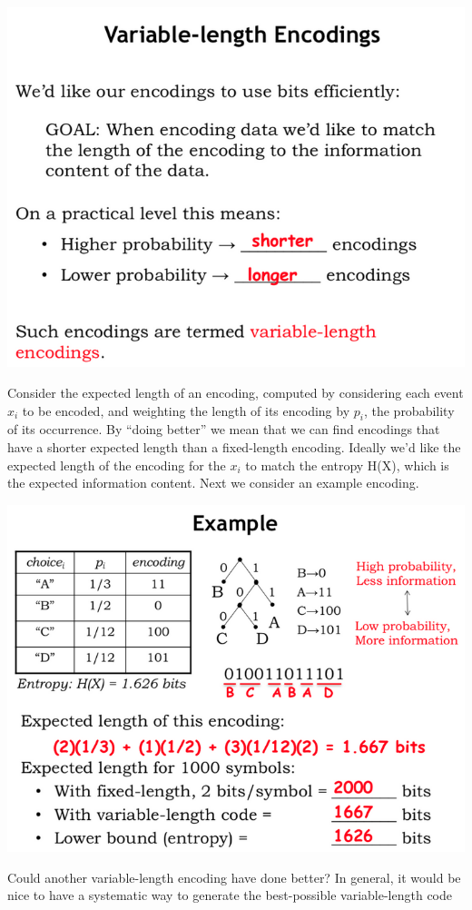 \documentclass[a4paper,twoside]{article}
\numberwithin{equation}{section}
\begin{document}
\begin{center}
    \includegraphics[scale=0.3]{assets/variable_length_encoding.png}
\end{center}
Consider the expected length of an encoding, computed by considering each event $x_i$  to be encoded,
 and weighting the length of its encoding by $p_i$, the probability of its occurrence. By “doing better”
  we mean that we can find encodings that have a shorter expected length than a fixed-length encoding.
  Ideally we'd like the expected length of the encoding for the $x_i$ to match the entropy H(X), which
  is the expected information content. Next we consider an example encoding.
\begin{center}
    \includegraphics[scale=0.3]{assets/example_encoding.png}
\end{center}
Could another variable-length encoding have done better? In general, it would be nice to have a
 systematic way to generate the best-possible variable-length code
\end{document}
